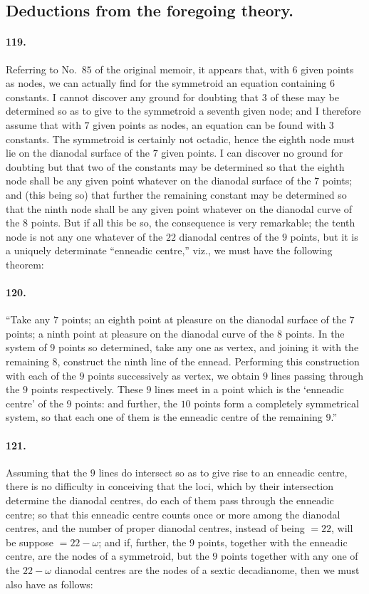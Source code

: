 \documentclass[11pt,a4paper]{article}
\begin{document}
\subsection*{Deductions from the foregoing theory.}

\paragraph{119.}
Referring to No.~$85$ of the original memoir, it appears that, with $6$
given points as nodes, we can actually find for the symmetroid an equation
containing $6$ constants. I cannot discover any ground for doubting that
$3$ of these may be determined so as to give to the symmetroid a seventh
given node; and I therefore assume that with $7$ given points as nodes,
an equation can be found with $3$ constants. The symmetroid is certainly
not octadic, hence the eighth node must lie on the dianodal surface of
the $7$ given points. I can discover no ground for doubting but that two
of the constants may be determined so that the eighth node shall be any
given point whatever on the dianodal surface of the $7$ points; and (this
being so) that further the remaining constant may be determined so that
the ninth node shall be any given point whatever on the dianodal curve of
the $8$ points. But if all this be so, the consequence is very remarkable;
the tenth node is not any one whatever of the $22$ dianodal centres of
the $9$ points, but it is a uniquely determinate ``enneadic centre,''
viz., we must have the following theorem:

\paragraph{120.}
``Take any $7$ points; an eighth point at pleasure on the dianodal surface
of the $7$ points; a ninth point at pleasure on the dianodal curve of the
$8$ points. In the system of $9$ points so determined, take any one as
vertex, and joining it with the remaining $8$, construct the ninth line
of the ennead. Performing this construction with each of the $9$ points
successively as vertex, we obtain $9$ lines passing through the $9$ points
respectively. These $9$ lines meet in a point which is the `enneadic
centre' of the $9$ points: and further, the $10$ points form a completely
symmetrical system, so that each one of them is the enneadic centre of the
remaining $9$.''

\paragraph{121.}
Assuming that the $9$ lines do intersect so as to give rise to an enneadic
centre, there is no difficulty in conceiving that the loci, which by their
intersection determine the dianodal centres, do each of them pass through
the enneadic centre; so that this enneadic centre counts once or more
among the dianodal centres, and the number of proper dianodal centres,
instead of being $= 22$, will be suppose $= 22 - \omega$; and if, further,
the $9$ points, together with the enneadic centre, are the nodes of a
symmetroid, but the $9$ points together with any one of the $22 - \omega$
dianodal centres are the nodes of a sextic decadianome, then we must also
have as follows:
\end{document}
